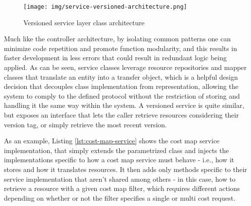 \begin{figure}[ht]
\centering
\texttt{[image: img/service-versioned-architecture.png]}
\label{fig:service-versioned-architecture}
\caption{Versioned service layer class architecture}
\end{figure}

    Much like the controller architecture, by isolating common patterns one can minimize code repetition and promote function modularity, and this results in faster development in less errors that could result in redundant logic being applied.
    As can be seen, service classes leverage resource repositories and mapper classes that translate an entity into a transfer object, which is a helpful design decision that decouples class implementation from representation, allowing the system to comply to the defined protocol without the restriction of storing and handling it the same way within the system.
    A versioned service is quite similar, but exposes an interface that lets the caller retrieve resources considering their version tag, or simply retrieve the most recent version.

    As an example, Listing \ref{lst:cost-map-service} shows the cost map service implementation, that simply extends the parametrized class and injects the implementations specific to how a cost map service must behave - i.e., how it stores and how it translates resources.
    It then adds only methods specific to their service implementation that aren't shared among others - in this case, how to retrieve a resource with a given cost map filter, which requires different actions depending on whether or not the filter specifies a single or multi cost request.

